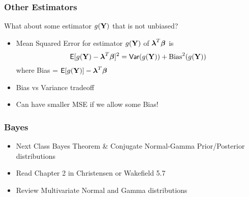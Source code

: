 \documentclass{beamer}\usepackage[]{graphicx}\usepackage[]{color}
\begin{document}
\begin{frame} \frametitle{Other Estimators}
What about some estimator $g(\mathbf{Y})$ that is not unbiased? \pause
  \begin{itemize}
\item Mean Squared Error for estimator $g(\mathbf{Y})$ of $\boldsymbol{\lambda}^T\boldsymbol{\beta}$ is
$$\textsf{E}[g(\mathbf{Y}) - \boldsymbol{\lambda}^T\boldsymbol{\beta}]^2 = \textsf{Var}(g(\mathbf{Y})) + \text{Bias}^2(g(\mathbf{Y}))$$
where Bias = $\textsf{E}[g(\mathbf{Y})] - \boldsymbol{\lambda}^T\boldsymbol{\beta}$  \pause
\item Bias vs Variance tradeoff \pause
\item Can have smaller MSE if we allow some Bias!
\end{itemize}
\end{frame}

\begin{frame}\frametitle{Bayes}
  \begin{itemize}
  \item  Next Class Bayes Theorem \& Conjugate Normal-Gamma Prior/Posterior   distributions
  \item  Read   Chapter 2 in Christensen or Wakefield 5.7
  \item  Review Multivariate Normal and Gamma distributions
  \end{itemize}





\end{frame}
\end{document}
